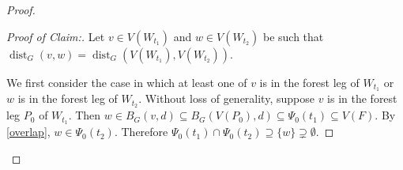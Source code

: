 \documentclass{patmorin}
\newcommand{\pat}[1]{\textcolor{Blue}{Pat: #1}}
\newenvironment{clmproof}{\begin{proof}[Proof of Claim:]\renewcommand{\qedsymbol}{\rule{1ex}{1ex}}}{\end{proof}}
\DeclareMathOperator{\dist}{dist}
\begin{document}
\begin{proof}

\begin{clmproof}
  Let $v\in V(W_{t_1})$ and $w\in V(W_{t_2})$ be such that $\dist_G(v,w)=\dist_G(V(W_{t_1}),V(W_{t_2}))$.

  We first consider the case in which at least one of $v$ is in the forest leg of $W_{t_1}$ or $w$ is in the forest leg of $W_{t_2}$.  Without loss of generality, suppose $v$ is in the forest leg $P_0$ of $W_{t_1}$. Then $w\in B_G(v,d)\subseteq B_G(V(P_0),d)\subseteq\Psi_0(t_1)\subseteq V(F)$.  By \cref{overlap}, $w\in \Psi_0(t_2)$.   Therefore $\Psi_0(t_1)\cap\Psi_0(t_2)\supseteq\{w\}\supsetneq\emptyset$.


\end{clmproof}
\end{proof}
\end{document}
